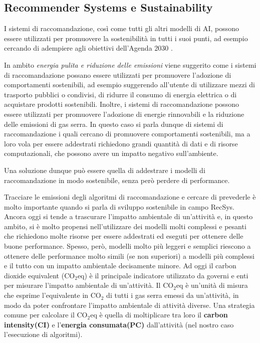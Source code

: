 \subsection{Recommender Systems e Sustainability}

I sistemi di raccomandazione, così come tutti gli altri modelli di AI, possono essere utilizzati per promuovere la sostenibilità in tutti i suoi punti, ad esempio cercando di adempiere agli obiettivi dell'Agenda 2030 \cite{RecommenderSustainability}.

\noindent In ambito \textit{energia pulita e riduzione delle emissioni} viene suggerito come i sistemi di raccomandazione possano essere utilizzati per promuovere l'adozione di comportamenti sostenibili, ad esempio suggerendo all'utente di utilizzare mezzi di trasporto pubblici o condivisi, di ridurre il consumo di energia elettrica o di acquistare prodotti sostenibili. Inoltre, i sistemi di raccomandazione possono essere utilizzati per promuovere l'adozione di energie rinnovabili e la riduzione delle emissioni di gas serra. In questo caso si parla dunque di sistemi di raccomandazione i quali cercano di promuovere comportamenti sostenibili, ma a loro vola per essere addestrati richiedono grandi quantità di dati e di risorse computazionali, che possono avere un impatto negativo sull'ambiente.

\noindent Una soluzione dunque può essere quella di addestrare i modelli di raccomandazione in modo sostenibile, senza però perdere di performance.

\noindent
Tracciare le emissioni degli algoritmi di raccomandazione e cercare di prevederle è molto importante quando si parla di sviluppo sostenibile in campo RecSys. Ancora oggi si tende a trascurare l'impatto ambientale di un'attività e, in questo ambito, si è molto propensi nell'utilizzare dei modelli molti complessi e pesanti
che richiedono molte risorse per essere addestrati ed eseguti per ottenere delle buone performance. Spesso, però, modelli molto più leggeri e semplici riescono a ottenere delle performance molto simili (se non superiori) a modelli più complessi e il tutto con un impatto ambientale decisamente minore.
Ad oggi il carbon dioxide equivalent (CO$_2$eq) è il principale indicatore utilizzato da governi e enti per misurare l'impatto ambientale di un'attività.
Il CO$_2$eq è un'unità di misura che esprime l'equivalente in CO$_2$ di tutti i gas serra emessi da un'attività, in modo da poter confrontare l'impatto ambientale di attività diverse.
Una strategia comune per calcolare il CO$_2$eq è quella di moltiplicare tra loro il \textbf{carbon intensity(CI)} e l'\textbf{energia consumata(PC)} dall'attività (nel nostro caso l'esecuzione di algoritmi).



